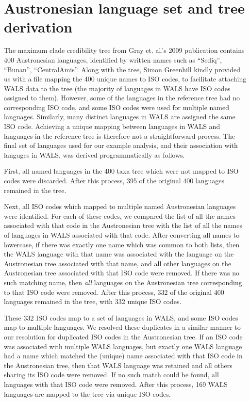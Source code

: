 \documentclass[10pt,a4paper]{article}
\begin{document}
\section{Austronesian language set and tree derivation}

The maximum clade credibility tree from Gray et. al.'s 2009 publication contains 400 Austronesian languages, identified by written names such as ``Sediq'', ``Bunan'', ``CentralAmis''.  Along with the tree, Simon Greenhill kindly provided us with a file mapping the 400 unique names to ISO codes, to facilitate attaching WALS data to the tree (the majority of languages in WALS have ISO codes assigned to them).  However, some of the languages in the reference tree had no corresponding ISO code, and some ISO codes were used for multiple named languages.  Similarly, many distinct languages in WALS are assigned the same ISO code.  Achieving a unique mapping between languages in WALS and languages in the reference tree is therefore not a straightforward process.  The final set of languages used for our example analysis, and their association with languges in WALS, was derived programmatically as follows.

First, all named languages in the 400 taxa tree which were not mapped to ISO codes were discarded.  After this process, 395 of the original 400 languages remained in the tree.

Next, all ISO codes which mapped to multiple named Austronesian languages were identified.  For each of these codes, we compared the list of all the names associated with that code in the Austronesian tree with the list of all the names of languages in WALS associated with that code.  After converting all names to lowercase, if there was exactly one name which was common to both lists, then the WALS language with that name was associated with the language on the Austronesian tree associated with that name, and all other languages on the Austronesian tree associated with that ISO code were removed.  If there was no such matching name, then \emph{all} languages on the Austronesian tree corresponding to that ISO code were removed.  After this process, 332 of the original 400 languages remained in the tree, with 332 unique ISO codes.

These 332 ISO codes map to a set of languages in WALS, and some ISO codes map to multiple languages.  We resolved these duplicates in a similar manner to our resolution for duplicated ISO codes in the Austronesian tree.  If an ISO code was associated with multiple WALS languages, but exactly one WALS language had a name which matched the (unique) name associated with that ISO code in the Austronesian tree, then that WALS language was retained and all others sharing its ISO code were removed.  If no such match could be found, all languages with that ISO code were removed.  After this process, 169 WALS languages are mapped to the tree via unique ISO codes.
\end{document}
